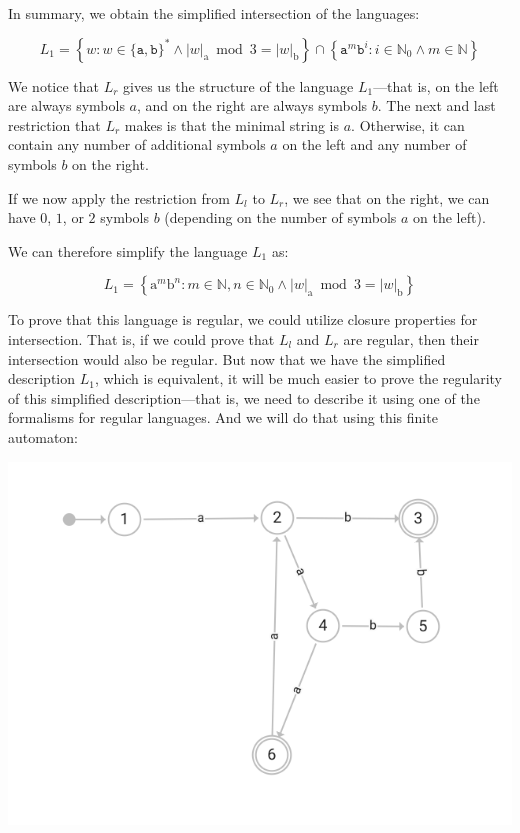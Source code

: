 \documentclass[10pt]{article}
\begin{document}
\begin{description}
In summary, we obtain the simplified intersection of the languages:

$$L_1=\left\{w: w \in\{\mathtt{a}, \mathtt{b}\}^{*} \wedge|w|_{\mathrm{a}} \bmod 3=|w|_{\mathrm{b}}\right\} \cap \left\{\mathtt{a}^{m} \mathtt{b}^{i}: i \in \mathbb{N}_{0} \land m \in \mathbb{N}\right\}$$

We notice that $L_r$ gives us the structure of the language $L_1$—that is, on the left are always symbols $a$, and on the right are always symbols $b$. The next and last restriction that $L_r$ makes is that the minimal string is $a$. Otherwise, it can contain any number of additional symbols $a$ on the left and any number of symbols $b$ on the right.

If we now apply the restriction from $L_l$ to $L_r$, we see that on the right, we can have $0$, $1$, or $2$ symbols $b$ (depending on the number of symbols $a$ on the left).

We can therefore simplify the language $L_1$ as:

$$L_1 = \left\{
\mathrm{a}^{m}\mathrm{b}^{n}: m \in \mathbb{N}, n \in \mathbb{N}_{0} \land |w|_{\mathrm{a}} \bmod 3 = |w|_{\mathrm{b}}
\right\}$$

To prove that this language is regular, we could utilize closure properties for intersection. That is, if we could prove that $L_l$ and $L_r$ are regular, then their intersection would also be regular. But now that we have the simplified description $L_1$, which is equivalent, it will be much easier to prove the regularity of this simplified description—that is, we need to describe it using one of the formalisms for regular languages. And we will do that using this finite automaton:

\includegraphics[width=\textwidth]{automat.png}


\end{description}
\end{document}
